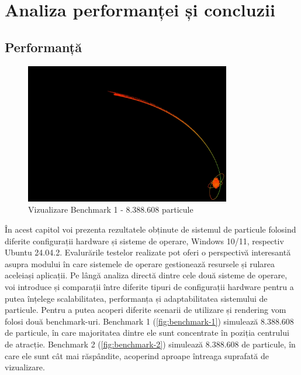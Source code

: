 \chapter{Analiza performanței și concluzii}

\section{Performanță}
\begin{figure}[ht]
    \centering
    \includegraphics[width=0.8\textwidth]{images/benchmark-1.png}
    \caption{Vizualizare Benchmark 1 - 8.388.608 particule}
    \label{fig:benchmark-1}
\end{figure}

În acest capitol voi prezenta rezultatele obținute de sistemul de particule folosind diferite configurații hardware și sisteme de operare, Windows 10/11, respectiv Ubuntu 24.04.2. Evalurările testelor realizate pot oferi o perspectivă interesantă asupra modului în care sistemele de operare gestionează resursele și rularea aceleiași aplicații. Pe lângă analiza directă dintre cele două sisteme de operare, voi introduce și comparații între diferite tipuri de configurații hardware pentru a putea înțelege scalabilitatea, performanța și adaptabilitatea sistemului de particule. Pentru a putea acoperi diferite scenarii de utilizare și rendering vom folosi două benchmark-uri. Benchmark 1 (\autoref{fig:benchmark-1}) simulează 8.388.608 de particule, în care majoritatea dintre ele sunt concentrate în poziția centrului de atracție. Benchmark 2 (\autoref{fig:benchmark-2}) simulează 8.388.608 de particule, în care ele sunt cât mai răspândite, acoperind aproape întreaga suprafată de vizualizare. 

